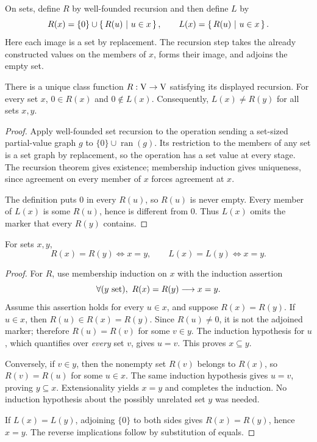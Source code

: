 \begin{definition}
On sets, define $R$ by well-founded recursion and then define $L$ by
\[
R(x)=\{0\}\cup\left\{\,R(u)\ \middle|\ u\in x\,\right\},
\qquad
L(x)=\left\{\,R(u)\ \middle|\ u\in x\,\right\}.
\label{def:recursive_pair_tags}
\]
Here each image is a set by replacement. The recursion step takes the
already constructed values on the members of $x$, forms their image, and
adjoins the empty set.
\end{definition}

\begin{lemma}
There is a unique class function $R:\mathrm{V}\to\mathrm{V}$ satisfying its displayed
recursion. For every set $x$, $0\in R(x)$ and $0\notin L(x)$. Consequently,
$L(x)\ne R(y)$ for all sets $x,y$.
\end{lemma}
\begin{proof}
Apply well-founded set recursion to the operation sending a set-sized
partial-value graph $g$ to $\{0\}\cup\operatorname{ran}(g)$. Its restriction
to the members of any set is a set graph by replacement, so the operation
has a set value at every stage. The recursion theorem gives existence;
membership induction gives uniqueness, since agreement on every member of
$x$ forces agreement at $x$.

The definition puts $0$ in every $R(u)$, so $R(u)$ is never empty.
Every member of $L(x)$ is some $R(u)$, hence is different from $0$.
Thus $L(x)$ omits the marker that every $R(y)$ contains.
\end{proof}

\begin{lemma}
For sets $x,y$,
\[
R(x)=R(y)\iff x=y,\qquad L(x)=L(y)\iff x=y.
\label{lem:recursive_pair_tag_injectivity}
\]
\end{lemma}
\begin{proof}
For $R$, use membership induction on $x$ with the induction assertion
\[
\forall (y\mathrm{\ set}),\ R(x)=R(y)\longrightarrow x=y.
\]
Assume this assertion holds for every $u\in x$, and suppose $R(x)=R(y)$.
If $u\in x$, then $R(u)\in R(x)=R(y)$. Since $R(u)\ne0$, it is not the
adjoined marker; therefore $R(u)=R(v)$ for some $v\in y$. The induction
hypothesis for $u$, which quantifies over \emph{every} set $v$, gives $u=v$.
This proves $x\subseteq y$.

Conversely, if $v\in y$, then the nonempty set $R(v)$ belongs to $R(x)$,
so $R(v)=R(u)$ for some $u\in x$. The same induction hypothesis gives
$u=v$, proving $y\subseteq x$. Extensionality yields $x=y$ and completes
the induction. No induction hypothesis about the possibly unrelated set
$y$ was needed.

If $L(x)=L(y)$, adjoining $\{0\}$ to both sides gives $R(x)=R(y)$,
hence $x=y$. The reverse implications follow by substitution of equals.
\end{proof}

